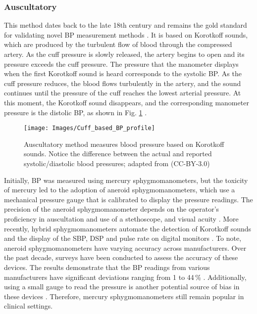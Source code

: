 \documentclass[journal,article,moreauthors]{Definitions/mdpi}
\begin{document}
\subsubsection{Auscultatory} This method dates back to the late 18th century and remains the gold standard for validating novel BP measurement methods \citep{Kumar2021-em}. It is based on Korotkoff sounds, which are produced by the turbulent flow of blood through the compressed artery. As the cuff pressure is slowly released, the artery begins to open and its pressure exceeds the cuff pressure. The pressure that the manometer displays when the first Korotkoff sound is heard corresponds to the systolic BP. As the cuff pressure reduces, the blood flows turbulently in the artery, and the sound continues until the pressure of the cuff reaches the lowest arterial pressure. At this moment, the Korotkoff sound disappears, and the corresponding manometer pressure is the distolic BP, as shown in Fig. \ref{Fig: KORTOKOFF} \citep{Kumar2021-em,peter2014review}. 

\begin{figure}[tb]
\centering
\texttt{[image: Images/Cuff\_based\_BP\_profile]}
\caption{Auscultatory method measures blood pressure based on Korotkoff sounds. Notice the difference between the actual and reported systolic/diastolic blood pressures; adapted from \citep{desaix2013anatomy} (CC-BY-3.0)}\label{Fig: KORTOKOFF}
\end{figure}

Initially, BP was measured using mercury sphygmomanometers, but the toxicity of mercury led to the adoption of aneroid sphygmomanometers, which use a mechanical pressure gauge that is calibrated to display the pressure readings. The precision of the aneroid sphygmomanometer depends on the operator's proficiency in auscultation and use of a stethoscope, and visual acuity \citep{Kumar2021-em}. More recently, hybrid sphygmomanometers automate the detection of Korotkoff sounds and the display of the SBP, DSP and pulse rate on digital monitors \citep{lim2022blood}. To note, aneroid sphygmomanometers have varying accuracy across manufacturers. Over the past decade, surveys have been conducted to assess the accuracy of these devices. The results demonstrate that the BP readings from various manufacturers have significant deviations ranging from 1 to 44\,\% \citep{Yarows2001, Canzanello2001, Mion1998, Kumar2021-em}. Additionally, using a small gauge to read the pressure is another potential source of bias in these devices \citep{Kumar2021-em}. Therefore, mercury sphygmomanometers still remain popular in clinical settings.
\end{document}

